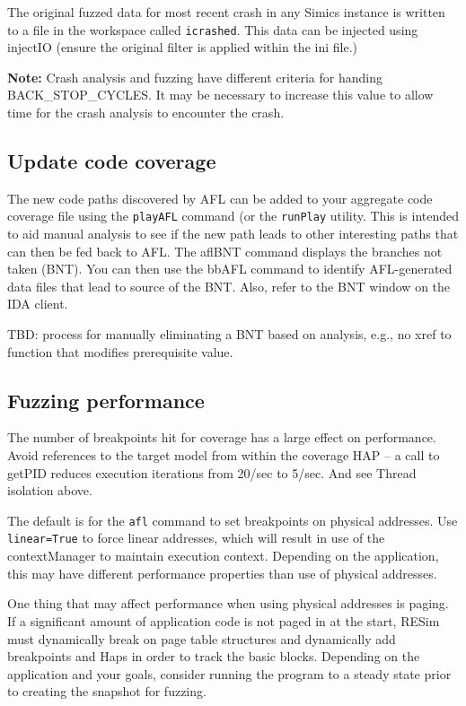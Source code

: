 \documentclass[titlepage]{article}
\begin{document}
The original fuzzed data for most recent crash in any Simics instance is written to a file in the workspace called {\tt icrashed}.  This data can be injected using
injectIO (ensure the original filter is applied within the ini file.)

\textbf{Note:} Crash analysis and fuzzing have different criteria for handing BACK\_STOP\_CYCLES.  It may be necessary to increase this 
value to allow time for the crash analysis to encounter the crash.


\subsection{Update code coverage}
The new code paths discovered by AFL can be added to your aggregate code coverage file using the {\tt playAFL} command (or the {\tt runPlay} utility.  This is intended
to aid manual analysis to see if the new path leads to other interesting paths that can then be fed back to AFL.  
The  aflBNT command displays the branches not taken (BNT).  You can then use the bbAFL command to identify AFL-generated data files
that lead to source of the BNT.  Also, refer to the BNT window on
the IDA client.

TBD: process for manually eliminating a BNT based on analysis, e.g., no xref to function that modifies prerequisite value.

\subsection{Fuzzing performance}
The number of breakpoints hit for coverage has a large effect on performance.
Avoid references to the target model from within the coverage HAP -- a call to getPID reduces execution iterations from 20/sec to 5/sec.
And see Thread isolation above.

The default is for the {\tt afl} command to set breakpoints on physical addresses.  Use {\tt linear=True} to force linear addresses, which will
result in use of the contextManager to maintain execution context.  Depending on the application, this may have different performance properties than 
use of physical addresses.  

One thing that may affect performance when using physical addresses is paging. If a significant amount of application code is not paged in at the
start, RESim must dynamically break on page table structures and dynamically add breakpoints and Haps in order to track the basic blocks.  Depending on
the  application and your goals, consider running the program to a steady state prior to creating the snapshot for fuzzing.
\end{document}
